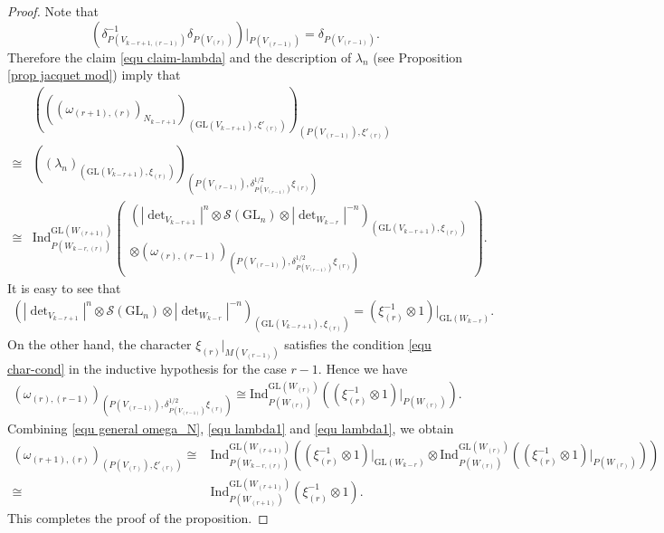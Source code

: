 \documentclass[11pt,reqno]{amsart}
\renewcommand{\1}{{\mathbf{1}}} \newcommand{\sB}{{\mathscr{B}}}
\newcommand{\CS}{{\mathcal {S}}} \newcommand{\CT}{{\mathcal {T}}}
\newcommand{\GL}{{\mathrm{GL}}}\newcommand{\G}{{\mathrm{G}}}
\newcommand{\Ind}{{\mathrm{Ind}}} \newcommand{\ind}{{\mathrm{ind}}}
\theoremstyle{plain}
\theoremstyle{definition}
\numberwithin{equation}{section}
\begin{document}
\begin{proof}
Note that
$$\left(\delta^{-1}_{P(V_{k-r+1,(r-1)})}\delta_{P(V_{(r)})}\right)|_{P(V_{(r-1)})}=\delta_{P(V_{(r-1)})}.$$
Therefore the claim \eqref{equ claim-lambda} and the description of $\lambda_n$ (see Proposition \ref{prop jacquet mod}) imply that 
\begin{equation}\label{equ general omega_N}\begin{aligned}&\left(\left(\left(\omega_{(r+1),(r)}\right)_{N_{k-r+1}} \right)_{\left(\GL(V_{k-r+1}),\xi'_{(r)}\right)}\right)_{\left(P(V_{(r-1)}),\xi'_{(r)}\right)}\\
\cong&\left((\lambda_n)_{\left(\GL(V_{k-r+1}), \xi_{(r)}\right)}\right)_{\left(P(V_{(r-1)}),\delta^{1/2}_{P(V_{(r-1)})}\xi_{(r)}\right)}\\
\cong&\Ind_{P(W_{k-r,(r)})}^{\GL(W_{(r+1)})}\left(\begin{array}{c}\left(|\det\nolimits_{V_{k-r+1}}|^n\otimes\CS(\GL_n)\otimes|\det\nolimits_{W_{k-r}}|^{-n}\right)_{\left(\GL(V_{k-r+1}),\xi_{(r)}\right)}\\ \otimes\left(\omega_{(r),(r-1)}\right)_{\left(P(V_{(r-1)}),\delta^{1/2}_{P(V_{(r-1)})}\xi_{(r)}\right)}\end{array}\right).\end{aligned}
\end{equation}
It is easy to see that
\begin{equation}\label{equ lambda1}\begin{aligned}\left(|\det\nolimits_{V_{k-r+1}}|^n\otimes\CS(\GL_n)\otimes|\det\nolimits_{W_{k-r}}|^{-n}\right)_{\left(\GL(V_{k-r+1}),\xi_{(r)}\right)}
=\left(\xi^{-1}_{(r)}\otimes1\right)|_{\GL(W_{k-r})}.
\end{aligned}\end{equation}
On the other hand, the character $\xi_{(r)}|_{M(V_{(r-1)})}$ satisfies the condition \eqref{equ char-cond} in the inductive hypothesis for the case $r-1$.
Hence we have
\begin{equation}\label{equ lambda2}\begin{aligned}\left(\omega_{(r),(r-1)}\right)_{\left(P(V_{(r-1)}),\delta^{1/2}_{P(V_{(r-1)})}\xi_{(r)}\right)}
\cong\Ind^{\GL(W_{(r)})}_{P(W_{(r)})}\left(\left(\xi^{-1}_{(r)}\otimes1\right)|_{P(W_{(r)})}\right).
\end{aligned}\end{equation}
Combining \eqref{equ general omega_N}, \eqref{equ lambda1} and \eqref{equ lambda1}, we obtain
$$\begin{aligned}
(\omega_{(r+1),(r)})_{(P(V_{(r)}),\xi'_{(r)})}
\cong&\Ind_{P(W_{k-r,(r)})}^{\GL(W_{(r+1)})}\left(\left(\xi^{-1}_{(r)}\otimes1\right)|_{\GL(W_{k-r})}\otimes\Ind^{\GL(W_{(r)})}_{P(W_{(r)})}\left(\left(\xi^{-1}_{(r)}\otimes1\right)|_{P(W_{(r)})}\right) \right)\\
\cong&\Ind^{\GL(W_{(r+1)})}_{P(W_{(r+1)})}(\xi^{-1}_{(r)}\otimes1).
\end{aligned}$$
This completes the proof of the proposition.
\end{proof}
\end{document}
